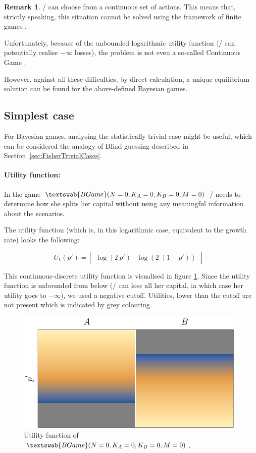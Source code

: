 \documentclass{article}
\theoremstyle{definition}
\newtheorem*{remark}{Remark}
\newcommand{\BG}[1]{$\textswab{BGame}(#1)$}
\begin{document}
\begin{remark}
    \PI/ can choose from a continuous set of actions. This means that, strictly speaking, this situation cannot be solved using the framework of finite games \cite{book:GameTheory}.

    Unfortunately, because of the unbounded logarithmic utility function (\PI/ can potentially realise $-\infty$ losses), the problem is not even a so-called Continuous Game \cite{paper:ContinuousEquilibrium}.

    However, against all these difficulties, by direct calculation, a unique equilibrium solution can be found for the above-defined Bayesian games.
    
\end{remark}


\subsection{Simplest case}

For Bayesian games, analysing the statistically trivial case might be useful, which can be considered the analogy of Blind guessing described in Section~\ref{sec:FisherTrivialCases}.

\paragraph{Utility function:}

In the game \BG{N=0,K_A=0,K_B=0,M=0} \PI/ needs to determine how she splits her capital without using any meaningful information about the scenarios.

The utility function (which is, in this logarithmic case, equivalent to the growth rate) looks the following:

\begin{equation}
U_1(p')=
\begin{bmatrix}
\log(2 \ p') & \log(2 \ (1-p'))
\end{bmatrix}
\end{equation}

This continuous-discrete utility function is visualised in figure \ref{fig:U_0000}. Since the utility function is unbounded from below (\PI/ can lose all her capital, in which case her utility goes to $-\infty$), we used a negative cutoff. Utilities, lower than the cutoff are not present which is indicated by grey colouring.

\begin{figure}[H]
    \centering
    \includegraphics[width=8 cm]{img/BayesAB.png}
    \caption{Utility function of \BG{N=0,K_A=0,K_B=0,M=0}.}
    \label{fig:U_0000}
\end{figure}
\end{document}
